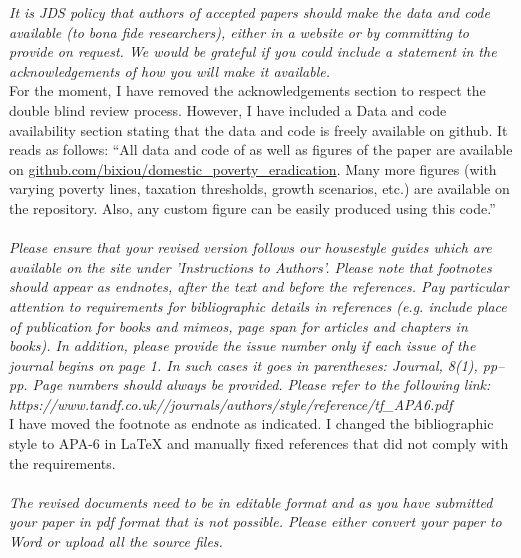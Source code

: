\documentclass[12pt,english]{article}
\begin{document}
\textit{It is JDS policy that authors of accepted papers should make the data and code available (to bona fide researchers), either in a website or by committing to provide on request.  We would be grateful if you could include a statement in the acknowledgements of how you will make it available.}~\\

For the moment, I have removed the acknowledgements section to respect the double blind review process. However, I have included a Data and code availability section stating that the data and code is freely available on github. It reads as follows: ``All data and code of as well as figures of the paper are available on \href{https://github.com/bixiou/domestic_poverty_eradication}{github.com/bixiou/domestic\_poverty\_eradication}. Many more figures (with varying poverty lines, taxation thresholds, growth scenarios, etc.) are available on the repository. %
Also, any custom figure can be easily produced using this code.''
~\\ ~\\

\textit{Please ensure that your revised version follows our housestyle guides which are available on the site under 'Instructions to Authors'.  Please note that footnotes should appear as endnotes, after the text and before the references.   Pay particular attention to requirements for bibliographic details in references (e.g. include place of publication for books and mimeos, page span for articles and chapters in books).  In addition, please provide the issue number only if each issue of the journal begins on page 1.  In such cases it goes in parentheses:  Journal, 8(1), pp–pp.  Page numbers should always be provided.  Please refer to the following link:   https://www.tandf.co.uk//journals/authors/style/reference/tf\_APA6.pdf}~\\

I have moved the footnote as endnote as indicated. I changed the bibliographic style to APA-6 in LaTeX and manually fixed references that did not comply with the requirements. 
~\\ ~\\

\textit{The revised documents need to be in editable format and as you have submitted your paper in pdf format that is not possible. Please either convert your paper to Word or upload all the source files.}~\\
\end{document}
